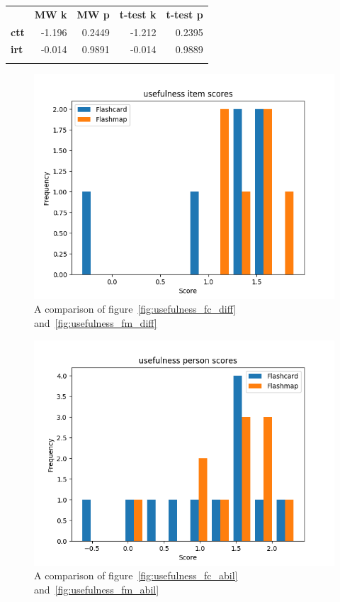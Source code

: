 \begin{longtable}[c]{@{}lrrrr@{}}
\toprule\addlinespace
& \textbf{MW k} & \textbf{MW p} &
\textbf{t-test k} & \textbf{t-test p}
\\\addlinespace
\midrule
\textbf{ctt} & -1.196 & 0.2449 & -1.212 & 0.2395
\\\addlinespace
\textbf{irt} & -0.014 & 0.9891 & -0.014 & 0.9889
\\\addlinespace
\bottomrule
    \label{tab:usefulness_comp}
\end{longtable}

\begin{figure}
    \centering
    \includegraphics[width=.7\textwidth]{img/usefulness_diff.png}
    \caption{A comparison of figure~\protect\ref{fig:usefulness_fc_diff} and~\protect\ref{fig:usefulness_fm_diff}}
    \label{fig:usefulness_diff}
\end{figure}
\begin{figure}
    \centering
    \includegraphics[width=.7\textwidth]{img/usefulness_abil.png}
    \caption{A comparison of figure~\protect\ref{fig:usefulness_fc_abil} and~\protect\ref{fig:usefulness_fm_abil}}
    \label{fig:usefulness_abil}
\end{figure}

